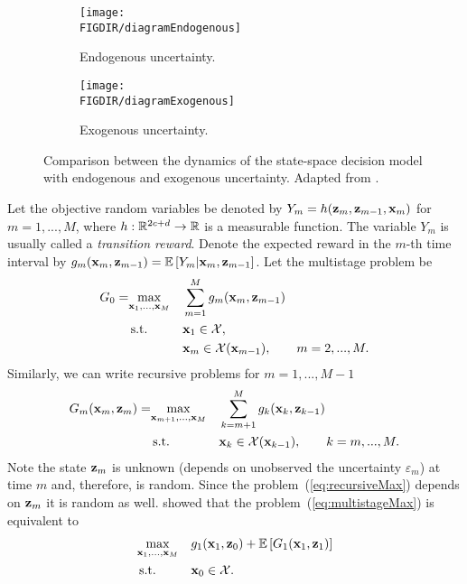 \begin{figure}[t]
	\centering
	
		\begin{subfigure}[b]{\textwidth}
			\centering
			\texttt{[image: \\FIGDIR/diagramEndogenous]}
			\caption{Endogenous uncertainty.}
		\end{subfigure}
		\begin{subfigure}[b]{\textwidth}
			\centering
			\texttt{[image: \\FIGDIR/diagramExogenous]}
			\caption{Exogenous uncertainty.}
		\end{subfigure}

	\caption{Comparison between the dynamics of the state-space decision model with endogenous and exogenous uncertainty. Adapted from \cite{Pflug14}.}
	\label{fig:dynamics}
\end{figure}

Let the objective random variables be denoted by $Y_m = h (\operatorname{\mathbf{z}}_m, \operatorname{\mathbf{z}}_{m-1}, \mathbf{x}_{m})$ for $m=1, ..., M$, where $h: \mathbb{R}^{2c+d} \to \mathbb{R}$ is a measurable function. The variable $Y_m$ is usually called a \emph{transition reward}. Denote the expected reward in the $m$-th time interval by $g_{m} (\mathbf{x}_{m}, \operatorname{\mathbf{z}}_{m-1}) = \operatorname{\mathbb{E}\,} [Y_m \vert \mathbf{x}_{m}, \operatorname{\mathbf{z}}_{m-1}]$. Let the multistage problem be
\begin{equation}
	\label{eq:multistageMax}
	\begin{aligned}
		G_0 = & \underset{\mathbf{x}_1, ..., \mathbf{x}_{M}}{\max} & & \sum_{m=1}^M  g_m (\mathbf{x}_{m}, \operatorname{\mathbf{z}}_{m-1})\\
		& \operatorname{\textrm{s.t.}} & & \mathbf{x}_1 \in \mathcal{X}, \\
		&  		& & \mathbf{x}_m \in \mathcal{X} (\mathbf{x}_{m-1}), \qquad m = 2, ..., M.
	\end{aligned}
\end{equation}
Similarly, we can write recursive problems for $m = 1, ..., M-1$
\begin{equation}
	\label{eq:recursiveMax}
	\begin{aligned}
		G_m (\mathbf{x}_{m}, \operatorname{\mathbf{z}}_{m}) = & \underset{\mathbf{x}_{m+1}, ..., \mathbf{x}_{M}}{\max} & & \sum_{k=m+1}^M  g_k (\mathbf{x}_{k}, \operatorname{\mathbf{z}}_{k-1})\\
		& \operatorname{\textrm{s.t.}} & & \mathbf{x}_k \in \mathcal{X} (\mathbf{x}_{k-1}), \qquad k = m, ..., M.
	\end{aligned}
\end{equation}
Note the state $\operatorname{\mathbf{z}}_{m}$ is unknown (depends on unobserved the uncertainty $\varepsilon_{m}$) at time $m$ and, therefore, is random. Since the problem~(\ref{eq:recursiveMax}) depends on $\operatorname{\mathbf{z}}_{m}$ it is random as well. \cite{Pflug14} showed that the problem~(\ref{eq:multistageMax}) is equivalent to
\begin{equation}
	\label{eq:reformMax}
	\begin{aligned}
		& \underset{\mathbf{x}_1, ..., \mathbf{x}_{M}}{\max} & & g_1 (\mathbf{x}_{1}, \operatorname{\mathbf{z}}_{0}) + \operatorname{\mathbb{E}\,} [G_1 (\mathbf{x}_{1}, \operatorname{\mathbf{z}}_{1})] \\
		& \operatorname{\textrm{s.t.}} & & \mathbf{x}_0 \in \mathcal{X}.
	\end{aligned}
\end{equation}

